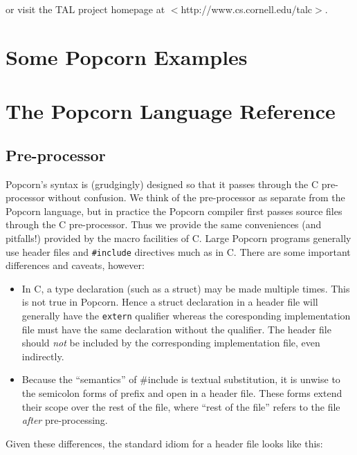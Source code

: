 \documentclass[titlepage,10pt]{article}
\begin{document}
or visit the TAL project homepage at $<$http://www.cs.cornell.edu/talc$>$.


\section{Some Popcorn Examples\label{examples}}


\section{The Popcorn Language Reference\label{language}}


\subsection{Pre-processor}

Popcorn's syntax is (grudgingly) designed so that it passes through the
C pre-processor without confusion.  We think of the pre-processor as
separate from the Popcorn language, but in practice the Popcorn compiler
first passes source files through the C pre-processor.  Thus we provide
the same conveniences (and pitfalls!) provided by the macro facilities
of C.  Large Popcorn programs generally use header files and
\texttt{\#include} directives much as in C.  There are some important
differences and caveats, however: 

\begin{itemize}

\item In C, a type declaration (such as a struct) may be made multiple
times.  This is not true in Popcorn.  Hence a struct declaration in a
header file will generally have the \texttt{extern} qualifier whereas
the coresponding implementation file must have the same declaration
without the qualifier.  The header file should \textit{not} be included
by the corresponding implementation file, even indirectly.

\item Because the ``semantics'' of \#include is textual substitution, it
is unwise to the semicolon forms of prefix and open in a header file.
These forms extend their scope over the rest of the file, where ``rest
of the file'' refers to the file \textit{after} pre-processing.

\end{itemize}

Given these differences, the standard idiom for a header file looks like this:

\end{document}
